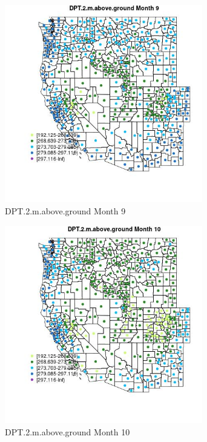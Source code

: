 \begin{figure} 
\centering  
\includegraphics[width=0.77\textwidth]{Code_Outputs/df_report_ML_predictors_CountyCentroid_Locations_Dates_2008-01-01to2018-12-31_MapObsMo9DPT2maboveground.jpg} 
\caption{\label{fig:df_report_ML_predictors_CountyCentroid_Locations_Dates_2008-01-01to2018-12-31MapObsMo9DPT2maboveground}DPT.2.m.above.ground Month 9} 
\end{figure} 
 

\begin{figure} 
\centering  
\includegraphics[width=0.77\textwidth]{Code_Outputs/df_report_ML_predictors_CountyCentroid_Locations_Dates_2008-01-01to2018-12-31_MapObsMo10DPT2maboveground.jpg} 
\caption{\label{fig:df_report_ML_predictors_CountyCentroid_Locations_Dates_2008-01-01to2018-12-31MapObsMo10DPT2maboveground}DPT.2.m.above.ground Month 10} 
\end{figure} 
 

